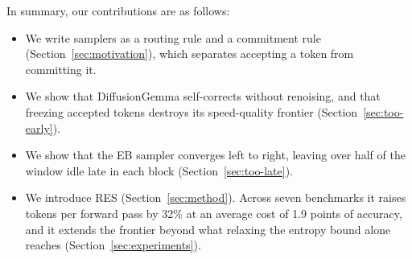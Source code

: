 In summary, our contributions are as follows:
\begin{itemize}
    \item We write samplers as a routing rule and a commitment rule (Section~\ref{sec:motivation}), which separates accepting a token from committing it.
    \item We show that DiffusionGemma self-corrects without renoising, and that freezing accepted tokens destroys its speed-quality frontier (Section~\ref{sec:too-early}).
    \item We show that the EB sampler converges left to right, leaving over half of the window idle late in each block (Section~\ref{sec:too-late}).
    \item We introduce RES (Section~\ref{sec:method}). Across seven benchmarks it raises tokens per forward pass by 32\% at an average cost of 1.9 points of accuracy, and it extends the frontier beyond what relaxing the entropy bound alone reaches (Section~\ref{sec:experiments}).
\end{itemize}






